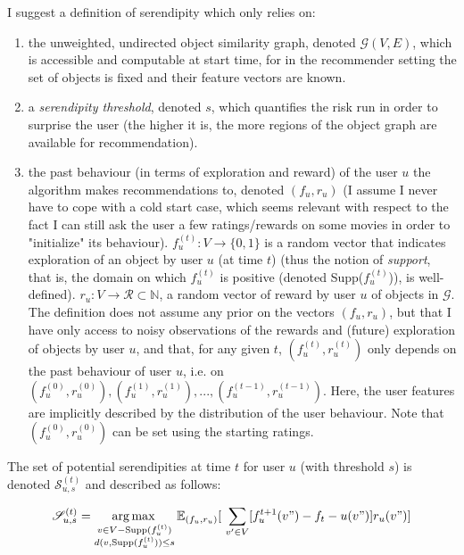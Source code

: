\documentclass{article}
\DeclareMathOperator*{\argmax}{arg\,max\,}
\begin{document}
I suggest a definition of serendipity which only relies on:
\begin{enumerate} 
\item the unweighted, undirected object similarity graph, denoted $\mathscr{G}(V, E)$, which is accessible and computable at start time, for in the recommender setting the set of objects is fixed and their feature vectors are known.
\item a \textit{serendipity threshold}, denoted $s$, which quantifies the risk run in order to surprise the user (the higher it is, the more regions of the object graph are available for recommendation).
\item the past behaviour (in terms of exploration and reward) of the user $u$ the algorithm makes recommendations to, denoted $(f_{u}, r_{u})$ (I assume I never have to cope with a cold start case, which seems relevant with respect to the fact I can still ask the user a few ratings/rewards on some movies in order to "initialize" its behaviour). $f^{(t)}_u : V \rightarrow \{0,1\}$ is a random vector that indicates exploration of an object by user $u$ (at time $t$) (thus the notion of \textit{support}, that is, the domain on which $f^{(t)}_{u}$ is positive (denoted Supp($f^{(t)}_{u}$)), is well-defined). $r_u : V \rightarrow \mathscr{R} \subset \mathbb{N}$, a random vector of reward by user $u$ of objects in $\mathscr{G}$. The definition does not assume any prior on the vectors $(f_{u}, r_{u})$, but that I have only access to noisy observations of the rewards and (future) exploration of objects by user $u$, and that, for any given $t$, $(f^{(t)}_{u}, r^{(t)}_{u})$ only depends on the past behaviour of user $u$, i.e. on $(f^{(0)}_{u}, r^{(0)}_{u}), (f^{(1)}_{u}, r^{(1)}_{u}), ..., (f^{(t-1)}_{u}, r^{(t-1)}_{u})$. Here, the user features are implicitly described by the distribution of the user behaviour. Note that $(f^{(0)}_{u}, r^{(0)}_{u})$ can be set using the starting ratings.
\end{enumerate}

The set of potential serendipities at time $t$ for user $u$ (with threshold $s$) is denoted $\mathscr{S}^{(t)}_{u,s}$ and described as follows:

\begin{equation}
\begin{split}
\mathscr{S}^{(t)}_{u,s} & = \argmax_{\substack{v \in V-\text{Supp}(f^{(t)}_{u})\\d(v, \text{Supp}(f^{(t)}_{u})) \leq s}} \mathbb{E}_{(f_{u},r_{u})}[ \sum_{v' \in V} [f^{t+1}_{u}(v")-f_{t}-u(v")]r_{u}(v") ]\\ %
\end{split}
\end{equation}
\end{document}
